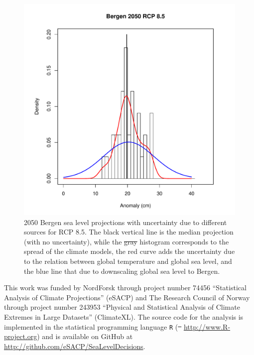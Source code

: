 \documentclass[draft,linenumbers]{agujournal}
\providecommand{\DIFadd}[1]{{\protect\color{blue}\uwave{#1}}} %
\providecommand{\DIFdel}[1]{{\protect\color{red}\sout{#1}}}                      %
\providecommand{\DIFaddbegin}{} %
\providecommand{\DIFaddend}{} %
\providecommand{\DIFdelbegin}{} %
\providecommand{\DIFdelend}{} %
\providecommand{\DIFaddFL}[1]{\DIFadd{#1}} %
\providecommand{\DIFdelFL}[1]{\DIFdel{#1}} %
\providecommand{\DIFaddbeginFL}{} %
\providecommand{\DIFaddendFL}{} %
\providecommand{\DIFdelbeginFL}{} %
\providecommand{\DIFdelendFL}{} %
\begin{document}
\begin{figure}[!hbpt]
\begin{center}
\includegraphics[width=0.5\linewidth]{unc.pdf}
\caption{2050 Bergen sea level projections with uncertainty due to different sources for RCP 8.5. The black vertical line is the median projection (with no uncertainty), while the \DIFdelbeginFL \DIFdelFL{gray }\DIFdelendFL \DIFaddbeginFL \DIFaddFL{grey }\DIFaddendFL histogram corresponds to the spread of the climate models, the red curve adds the uncertainty due to the relation between global temperature and global sea level, and the blue line that due to downscaling global sea level to Bergen. } 
\label{fig:unc}
\end{center}
\end{figure}





\begin{acknowledgments}
This work was funded by NordForsk through project number 74456 ``Statistical Analysis of Climate Projections'' (eSACP) and The Research Council of Norway through project number 243953 ``Physical and Statistical Analysis of Climate Extremes in Large Datasets'' (ClimateXL). The source code for the analysis is implemented in the statistical programming language {\tt R} (\DIFdelbegin \DIFdel{\mbox{%
\citet{R}}%
}\DIFdelend \DIFaddbegin \url{http://www.R-project.org}\DIFaddend ) and is available on GitHub at \DIFdelbegin %
\DIFdelend \DIFaddbegin \url{http://github.com/eSACP/SeaLevelDecisions}\DIFaddend .
\end{acknowledgments}








\end{document}

